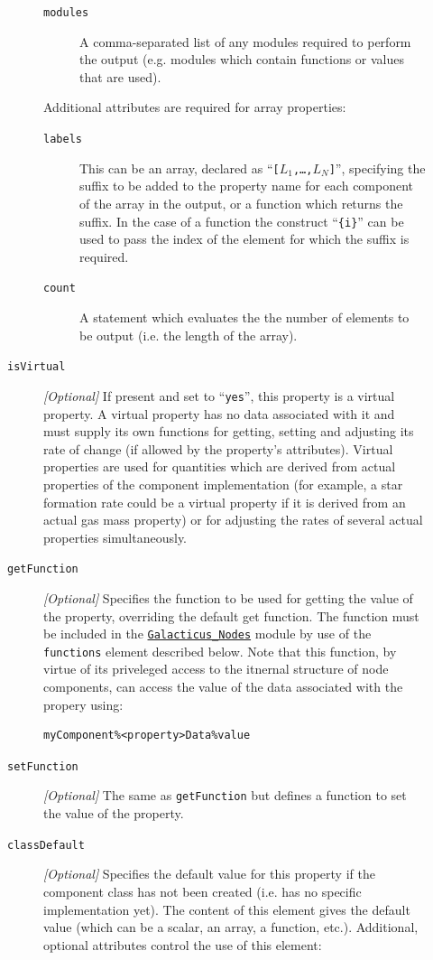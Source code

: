 \begin{description}
\begin{description}
\begin{description}
\item [{\tt modules}] A comma-separated list of any modules required to perform the output (e.g. modules which contain functions or values that are used).
\end{description}
Additional attributes are required for array properties:
\begin{description}
\item [{\tt labels}] This can be an array, declared as ``{\tt [$L_1$,\ldots,$L_N$]}'', specifying the suffix to be added to the property name for each component of the array in the output, or a function which returns the suffix. In the case of a function the construct ``{\tt \{i\}}'' can be used to pass the index of the element for which the suffix is required.
\item [{\tt count}] A statement which evaluates the the number of elements to be output (i.e. the length of the array).
\end{description}
\item [{\tt isVirtual}] \emph{[Optional]} If present and set to ``{\tt yes}'', this property is a virtual property. A virtual property has no data associated with it and must supply its own functions for getting, setting and adjusting its rate of change (if allowed by the property's attributes). Virtual properties are used for quantities which are derived from actual properties of the component implementation (for example, a star formation rate could be a virtual property if it is derived from an actual gas mass property) or for adjusting the rates of several actual properties simultaneously.
\item [{\tt getFunction}] \emph{[Optional]} Specifies the function to be used for getting the value of the property, overriding the default get function. The function must be included in the \hyperlink{objects.nodes.F90:galacticus_nodes}{\tt Galacticus\_Nodes} module by use of the {\tt functions} element described below. Note that this function, by virtue of its priveleged access to the itnernal structure of node components, can access the value of the data associated with the propery using:
\begin{verbatim}
myComponent%<property>Data%value
\end{verbatim}
\item [{\tt setFunction}] \emph{[Optional]} The same as {\tt getFunction} but defines a function to set the value of the property.
\item [{\tt classDefault}] \emph{[Optional]} Specifies the default value for this property if the component class has not been created (i.e. has no specific implementation yet). The content of this element gives the default value (which can be a scalar, an array, a function, etc.). Additional, optional attributes control the use of this element:

\end{description}
\end{description}
